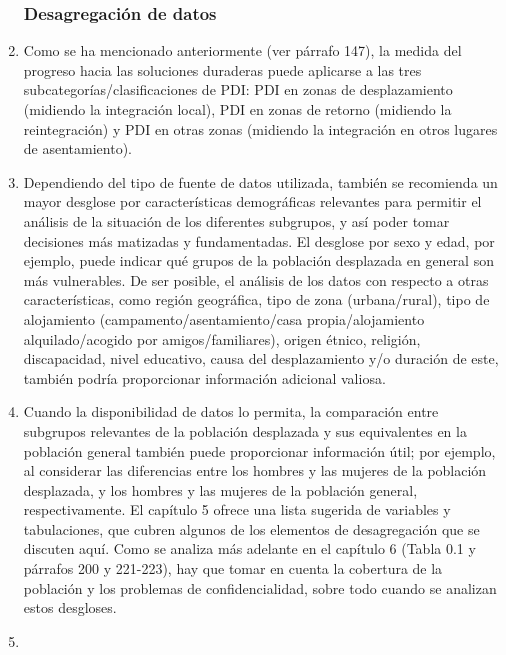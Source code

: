 \documentclass[
]{book}
\begin{document}
\begin{enumerate}
{  \subsubsection{Desagregación de datos}\label{desagregaciuxf3n-de-datos}}
\item
  Como se ha mencionado anteriormente (ver párrafo 147), la medida del progreso hacia las soluciones duraderas puede aplicarse a las tres subcategorías/clasificaciones de PDI: PDI en zonas de desplazamiento (midiendo la integración local), PDI en zonas de retorno (midiendo la reintegración) y PDI en otras zonas (midiendo la integración en otros lugares de asentamiento).
\item
  Dependiendo del tipo de fuente de datos utilizada, también se recomienda un mayor desglose por características demográficas relevantes para permitir el análisis de la situación de los diferentes subgrupos, y así poder tomar decisiones más matizadas y fundamentadas. El desglose por sexo y edad, por ejemplo, puede indicar qué grupos de la población desplazada en general son más vulnerables. De ser posible, el análisis de los datos con respecto a otras características, como región geográfica, tipo de zona (urbana/rural), tipo de alojamiento (campamento/asentamiento/casa propia/alojamiento alquilado/acogido por amigos/familiares), origen étnico, religión, discapacidad, nivel educativo, causa del desplazamiento y/o duración de este, también podría proporcionar información adicional valiosa.
\item
  Cuando la disponibilidad de datos lo permita, la comparación entre subgrupos relevantes de la población desplazada y sus equivalentes en la población general también puede proporcionar información útil; por ejemplo, al considerar las diferencias entre los hombres y las mujeres de la población desplazada, y los hombres y las mujeres de la población general, respectivamente. El capítulo 5 ofrece una lista sugerida de variables y tabulaciones, que cubren algunos de los elementos de desagregación que se discuten aquí. Como se analiza más adelante en el capítulo 6 (Tabla 0.1 y párrafos 200 y 221-223), hay que tomar en cuenta la cobertura de la población y los problemas de confidencialidad, sobre todo cuando se analizan estos desgloses.
\item ~
  \hypertarget{medida-compuesta-para-superar-las-principales-vulnerabilidades-relacionadas-con-el-desplazamiento}{%
}
\end{enumerate}
\end{document}

